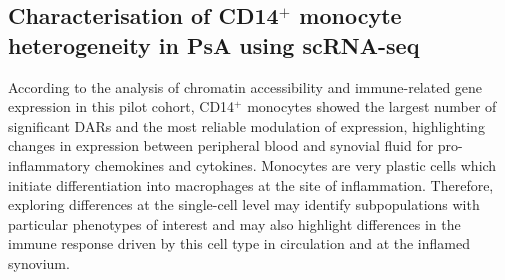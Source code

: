 \subsection{Characterisation of CD14$^+$ monocyte heterogeneity in PsA using scRNA-seq}
According to the analysis of chromatin accessibility and immune-related gene expression in this pilot cohort, CD14$^+$ monocytes showed the largest number of significant DARs and the most reliable modulation of expression, highlighting changes in expression between peripheral blood and synovial fluid for pro-inflammatory chemokines and cytokines. Monocytes are very plastic cells which initiate differentiation into macrophages at the site of inflammation. Therefore, exploring differences at the single-cell level may identify subpopulations with particular phenotypes of interest and may also highlight differences in the immune response driven by this cell type in circulation and at the inflamed synovium.


